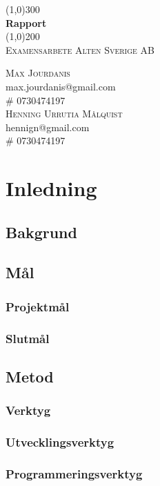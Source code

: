 \documentclass{article}
\begin{document}
\begin{titlepage}
    \begin{center}
        \line(1,0){300}\\
        \huge{\bfseries Rapport  }\\
        \line(1,0){200}\\
        [1cm]
        \textsc{\LARGE Examensarbete Alten Sverige AB }\\
        [13cm]
    \end{center}
    \begin{flushright}
        \textsc{\Large Max Jourdanis \\}
        max.jourdanis@gmail.com\\
        \# 0730474197\\
        [4pt]
        \textsc{\Large Henning Urrutia Målquist \\}
        hennign@gmail.com\\
        \# 0730474197
        
    \end{flushright}
    \end{titlepage}
\tableofcontents 

    \newpage
    
    \thispagestyle{empty}

    \cleardoublepage

    \setcounter{page}{1}
    
\section{Inledning}
    \subsection{Bakgrund}
    \subsection{Mål}
        \subsubsection{Projektmål}
        \subsubsection{Slutmål}
    \subsection{Metod}
        \subsubsection{Verktyg}
            \subsubsection{Utvecklingsverktyg}
            \subsubsection{Programmeringsverktyg}
\end{document}
